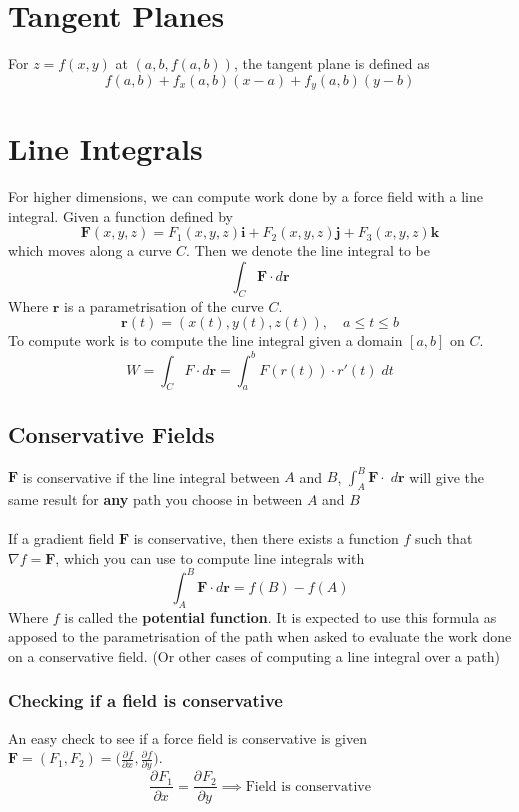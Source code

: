 \documentclass{article}
\theoremstyle{remark}
\theoremstyle{definition}
\begin{document}
\begin{landscape}
\begin{multicols*}{3}
  \section*{Tangent Planes}
  For \( z = f(x,y) \) at \( (a,b, f(a,b)) \), the tangent plane is defined as
  \[ 
    f(a,b) + f_x(a,b)(x-a) + f_y(a,b)(y-b)
  \]
  \section*{Line Integrals}
  For higher dimensions, we can compute work done by a force field with a line
  integral. Given a function defined by
  \[ 
    \textbf{F}(x,y,z) = F_1(x,y,z) \textbf{i} + F_2(x,y,z) \textbf{j} + F_3
    (x,y,z) \textbf{k}
  \]
  which moves along a curve \( C \). Then we denote the line integral to be
  \[ 
    \int_C  \textbf{F} \cdot d \textbf{r} 
  \]
  Where \( \textbf{r} \) is a parametrisation of the curve \( C \).
  \[ 
    \textbf{r}(t) = (x(t), y(t), z(t)), \quad a \leq t \leq b
  \]
  To compute work is to compute the line integral given a domain \( [a,b] \) on
  \( C \).
  \[ 
    W = \int_C^{}  F \cdot d\textbf{r} = \int_a^b  F(r(t)) \cdot r'(t) \; dt
  \]
  \subsection*{Conservative Fields}
  \( \textbf{F} \) is conservative if the line integral between \( A \) and \(
  B\), \( \displaystyle \int_A^B \textbf{F}\cdot   \; d \textbf{r} \) will give
  the same result for \textbf{any} path you choose in between \( A \) and \( B \)
  \\\\
  If a gradient field \( \textbf{F} \) is conservative, then there exists
  a function \( f \) such that \( \nabla f = \textbf{F} \), which you can use
  to compute line integrals with
  \[ 
    \int_A^B  \textbf{F}\cdot  d \textbf{r} = f(B) - f(A)
  \]
  Where \( f \) is called the \textbf{potential function}. It is expected to
  use this formula as apposed to the parametrisation of the path when asked to
  evaluate the work done on a conservative field. (Or other cases of computing
  a line integral over a path)

  \subsubsection*{Checking if a field is conservative}
  An easy check to see if a force field is conservative is given \( \textbf{F}
  = (F_1, F_2) = \Big (\displaystyle \frac{\partial^{}{f}}{\partial{x}^{}},
  \frac{\partial^{}{f}}{\partial{y}^{}}\Big ) \).
  \[ 
    \frac{\partial^{}{F_1}}{\partial{x}^{}}
    = \frac{\partial^{}{F_2}}{\partial{y}^{}} \implies \text{Field is
    conservative}
  \]
  
 \end{multicols*}
 \end{landscape}
\end{document}
